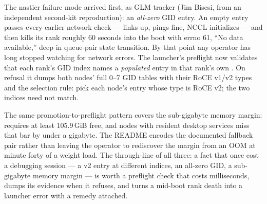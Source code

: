 \begin{hbwarstory}
The nastier failure mode arrived first, as GLM tracker 
(Jim Bisesi, from an independent second-kit reproduction): an
\emph{all-zero} GID entry. An empty entry passes every earlier network
check --- links up, pings fine, NCCL initializes --- and then kills its
rank roughly 60 seconds into the boot with  errno 61,
``No data available,'' deep in queue-pair state transition. By that point
any operator has long stopped watching for network errors. The launcher's
preflight now validates that each rank's GID index names a \emph{populated}
entry in that rank's own
. On refusal it
dumps both nodes' full 0--7 GID tables with their RoCE v1/v2 types and the
selection rule: pick each node's  entry whose type is
RoCE v2; the two indices need not match.
\end{hbwarstory}

The same promotion-to-preflight pattern covers the sub-gigabyte memory
margin:  requires at least 105.9\,GiB free, and
nodes with resident desktop services miss that bar by under a gigabyte. The
README encodes the documented fallback pair rather than leaving the
operator to rediscover the margin from an OOM at minute forty of a weight
load. The
through-line of all three: a fact that once cost a debugging session ---
a v2 entry at different indices, an all-zero GID, a sub-gigabyte memory
margin --- is worth a preflight check that costs milliseconds, dumps its
evidence when it refuses, and turns a mid-boot rank death into a launcher
error with a remedy attached.

